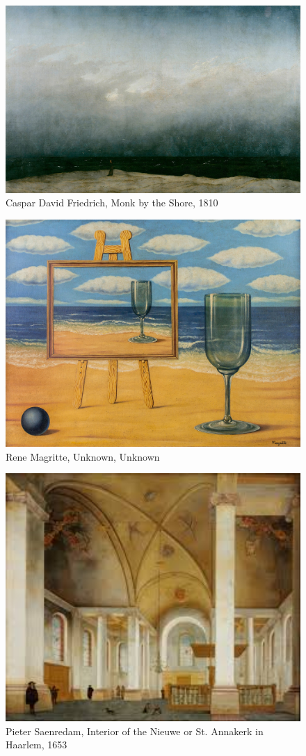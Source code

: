\begin{figure}[h]
	\centering
	\includegraphics[width=12cm]{inspire/MonkShore.jpg}
	\caption{Caspar David Friedrich, Monk by the Shore, 1810}
	\label{fig:MonkByShore}
\end{figure}


\begin{figure}[hb]
	\centering
	\includegraphics[width=12cm]{inspire/Magritte.jpg}
	\caption{Rene Magritte, Unknown, Unknown}
	\label{fig:Magritte}
\end{figure}


\begin{figure}[hb]
	\centering
	\includegraphics[width=12cm]{inspire/PieterSaenredam.jpg}
	\caption{Pieter Saenredam, Interior of the Nieuwe or St. Annakerk in Haarlem, 1653}
	\label{fig:PieterSaenredam}
\end{figure}


\vspace{1cm}







